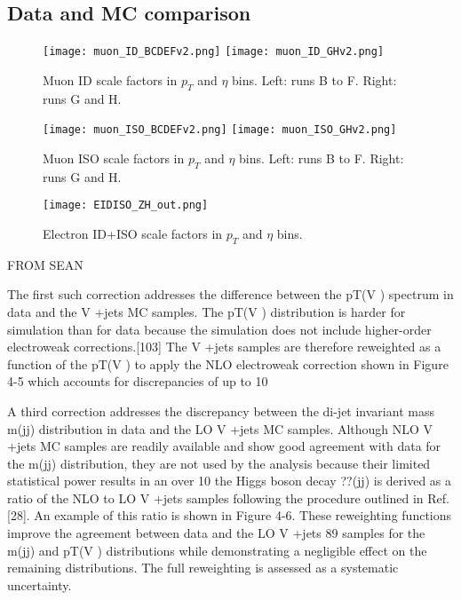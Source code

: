 \subsection{Data and MC comparison\label{sec:compareDataMC}}




\begin{figure}
\centering
\texttt{[image: muon\_ID\_BCDEFv2.png]}
\bigbreak
\texttt{[image: muon\_ID\_GHv2.png]}
\caption{ Muon ID scale factors in $p_{T}$ and $\eta$ bins. Left: runs B to F. Right: runs G and H.}
\label{fig:muonID_SF}
\end{figure}


\begin{figure}
\centering
\texttt{[image: muon\_ISO\_BCDEFv2.png]}
\bigbreak
\texttt{[image: muon\_ISO\_GHv2.png]}
\caption{ Muon ISO scale factors in $p_{T}$ and $\eta$ bins. Left: runs B to F. Right: runs G and H.}
\label{fig:muonISO_SF}
\end{figure}

\begin{figure}
\centering
\texttt{[image: EIDISO\_ZH\_out.png]}
\caption{ Electron ID+ISO scale factors in $p_{T}$ and $\eta$ bins.}
\label{fig:eleIDnISO_SF}
\end{figure}




FROM SEAN

The first such correction addresses the difference between the pT(V ) spectrum in data and the V +jets MC samples. The pT(V ) distribution is harder for simulation than for data because the simulation does not include higher-order electroweak corrections.[103] The V +jets samples are therefore reweighted as a function of the pT(V ) to apply the NLO electroweak correction shown in Figure 4-5 which accounts for discrepancies of up to 10%

A third correction addresses the discrepancy between the di-jet invariant mass m(jj)
distribution in data and the LO V +jets MC samples. Although NLO V +jets MC samples are readily available and show good agreement with data for the m(jj) distribution, they are not used by the analysis because their limited statistical power results in an over 10%
the Higgs boson decay ??(jj) is derived as a ratio of the NLO to LO V +jets samples following the procedure outlined in Ref. [28]. An example of this ratio is shown in Figure 4-6. These reweighting functions improve the agreement between data and the LO V +jets
89
samples for the m(jj) and pT(V ) distributions while demonstrating a negligible effect on the remaining distributions. The full reweighting is assessed as a systematic uncertainty.





